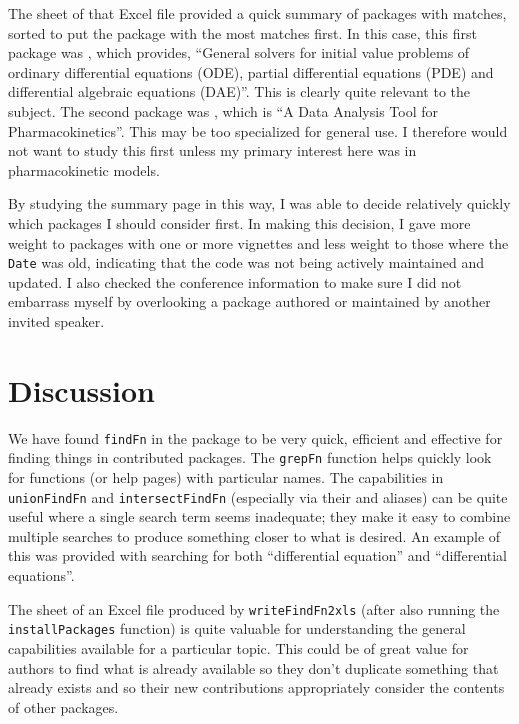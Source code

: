 The  sheet of that Excel file provided a quick
summary of packages with matches, sorted to put the package
with the most matches first.  In this case, this first package
was , which provides, ``General solvers for initial
value problems of ordinary differential equations (ODE),
partial differential equations (PDE) and differential
algebraic equations (DAE)''.  This is clearly quite relevant
to the subject.  The second package was , which
is ``A Data Analysis Tool for Pharmacokinetics''.  This may
be too specialized for general use.  I therefore would not
want to study this first unless my primary interest here was in
pharmacokinetic models.

By studying the summary page in this way, I was able to decide
relatively quickly which packages I should consider first.  In
making this decision, I gave more weight to packages with
one or more vignettes and less weight to those where the
{\tt Date} was old, indicating that the code was not being
actively maintained and updated.  I also checked the conference
information to make sure I did not embarrass myself by overlooking
a package authored or maintained by another invited speaker.

\section{Discussion}
We have found {\tt findFn} in the  package to
be very quick, efficient and effective for finding things in
contributed packages.  The {\tt grepFn} function helps quickly
look for functions (or help pages) with particular names.
The capabilities in {\tt unionFindFn} and {\tt intersectFindFn}
(especially via their \samp{|} and \samp{\&} aliases) can be quite useful
where a single search term seems inadequate;  they make it easy
to combine multiple searches to produce something closer to what
is desired.  An example of this was provided with searching for
both ``differential equation'' and ``differential equations''.

The  sheet of an Excel file produced by
{\tt writeFindFn2xls} (after also running the {\tt installPackages}
function) is quite valuable for understanding the
general capabilities available for a particular topic.
This could be of great value for authors to find what is already
available so they don't duplicate something that already exists
and so their new contributions appropriately consider
the contents of other packages.

